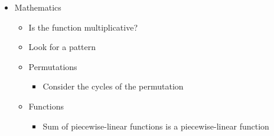 \documentclass[8pt,a4paper,landscape,oneside]{amsart}
\newenvironment{myitemize}
{ \begin{itemize}[leftmargin=.5cm]
    \setlength{\itemsep}{0pt}
    \setlength{\parskip}{0pt}
    \setlength{\parsep}{0pt}     }
{ \end{itemize}                  }
\begin{document}
\begin{multicols*}{3}
\begin{myitemize}
\begin{itemize}
\begin{itemize}
                                \item Centers of the tree
                            \end{itemize}
                        \item Eulerian path/circuit
                        \item Chinese postman problem
                        \item Topological sort
                        \item (Min-Cost) Max Flow
                        \item Min Cut
                            \begin{itemize}
                                \item Maximum Density Subgraph
                            \end{itemize}
                        \item Huffman Coding
                        \item Min-Cost Arborescence
                        \item Steiner Tree
                        \item Kirchoff's matrix tree theorem
                        \item Pr\"ufer sequences
                        \item Lov\'asz Toggle
                        \item Look at the DFS tree (which has no cross-edges)
                    \end{itemize}
                \item Mathematics
                    \begin{itemize}
                        \item Is the function multiplicative?
                        \item Look for a pattern
                        \item Permutations
                            \begin{itemize}
                                \item Consider the cycles of the permutation
                            \end{itemize}
                        \item Functions
                            \begin{itemize}
                                \item Sum of piecewise-linear functions is a piecewise-linear function

\end{itemize}
\end{itemize}
\end{myitemize}
\end{multicols*}
\end{document}

